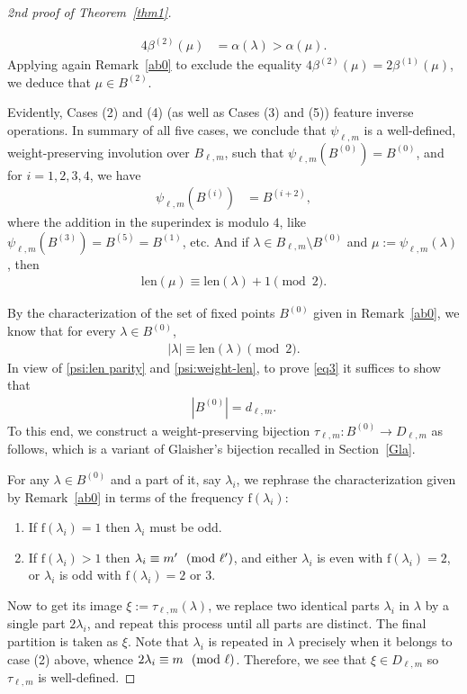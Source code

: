 \documentclass[12pt,reqno]{amsart}
\numberwithin{equation}{section}
\newcommand{\len}{\mathrm{len}}
\newcommand{\f}{\mathrm{f}}
\newcommand{\tpmod}[1]{\mkern 12mu(\textup{mod}\mkern 6mu #1)}
\begin{document}
\begin{proof}[2nd proof of Theorem~\ref{thm1}]
\begin{enumerate}
\begin{align*}
		4\beta^{(2)}(\mu) &=\alpha(\lambda)>\alpha(\mu).
	\end{align*}
	Applying again Remark~\ref{ab0} to exclude the equality $4\beta^{(2)}(\mu)=2\beta^{(1)}(\mu)$, we deduce that $\mu\in B^{(2)}$.
\end{enumerate}
Evidently, Cases (2) and (4) (as well as Cases (3) and (5)) feature inverse operations. In summary of all five cases, we conclude that $\psi_{\ell,m}$ is a well-defined, weight-preserving involution over $B_{\ell,m}$, such that $\psi_{\ell,m}(B^{(0)})=B^{(0)}$, and for $i=1,2,3,4$, we have
	\begin{align*}
		\psi_{\ell,m}(B^{(i)}) &= B^{(i+2)},
	\end{align*} 
where the addition in the superindex is modulo $4$, like $\psi_{\ell,m}(B^{(3)})=B^{(5)}=B^{(1)}$, etc. And if $\lambda\in B_{\ell,m}\setminus B^{(0)}$ and $\mu:=\psi_{\ell,m}(\lambda)$, then
\begin{align}\label{psi:len parity}
	\len(\mu) \equiv \len(\lambda)+1 \pmod 2.
\end{align}

By the characterization of the set of fixed points $B^{(0)}$ given in Remark~\ref{ab0}, we know that for every $\lambda\in B^{(0)}$,  
\begin{align}\label{psi:weight-len}
	|\lambda|\equiv \len(\lambda) \pmod 2.
\end{align}
In view of \eqref{psi:len parity} and \eqref{psi:weight-len}, to prove \eqref{eq3} it suffices to show that 
\begin{align}\label{eq:B0=dlm}
	|B^{(0)}|=d_{\ell,m}. 
\end{align}
To this end, we construct a weight-preserving bijection $\tau_{\ell,m}:B^{(0)}\to D_{\ell,m}$ as follows, which is a variant of Glaisher's bijection recalled in Section~\ref{Gla}. 

For any $\lambda\in B^{(0)}$ and a part of it, say $\lambda_i$, we rephrase the characterization given by Remark~\ref{ab0} in terms of the frequency $\f(\lambda_i)$: 
\begin{enumerate}
	\item If $\f(\lambda_i)=1$ then $\lambda_i$ must be odd.
	\item If $\f(\lambda_i)>1$ then $\lambda_i\equiv m'\tpmod{\ell'}$, and either $\lambda_i$ is even with $\f(\lambda_i)=2$, or $\lambda_i$ is odd with $\f(\lambda_i)=2$ or $3$.
\end{enumerate}
Now to get its image $\xi:=\tau_{\ell,m}(\lambda)$, we replace two identical parts $\lambda_i$ in $\lambda$ by a single part $2\lambda_i$, and repeat this process until all parts are distinct. The final partition is taken as $\xi$. Note that $\lambda_i$ is repeated in $\lambda$ precisely when it belongs to case (2) above, whence $2\lambda_i\equiv m\tpmod{\ell}$. Therefore, we see that $\xi\in D_{\ell,m}$ so $\tau_{\ell,m}$ is well-defined.


\end{proof}
\end{document}
